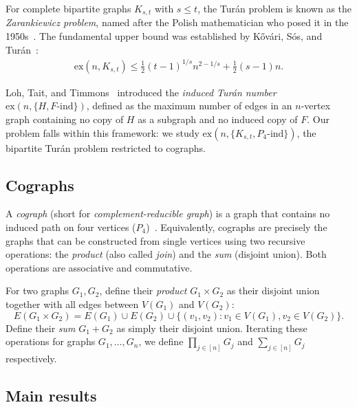 \documentclass{article}
\theoremstyle{definition}
\theoremstyle{definition}
\theoremstyle{definition}
\theoremstyle{definition}
\theoremstyle{definition}
\theoremstyle{definition}
\theoremstyle{definition}
\theoremstyle{definition}
\theoremstyle{definition}
\theoremstyle{definition}
\begin{document}
For complete bipartite graphs $K_{s,t}$ with $s \leq t$, the Turán problem is known as the \emph{Zarankiewicz problem}, named after the Polish mathematician who posed it in the 1950s~\cite{Smorodinsky2023}.
The fundamental upper bound was established by K\H{o}v\'ari, S\'os, and Tur\'an~\cite{KovariSosTuran1954}:
\begin{align}
    \text{ex}(n, K_{s,t}) \leq \tfrac{1}{2}(t-1)^{1/s} n^{2-1/s} + \tfrac{1}{2}(s-1)n. \label{eq:KST_background}
\end{align}

Loh, Tait, and Timmons~\cite{Loh2016} introduced the \emph{induced Tur\'an number} $\text{ex}(n, \{H, F\text{-ind}\})$, defined as the maximum number of edges in an $n$-vertex graph containing no copy of $H$ as a subgraph and no induced copy of $F$.
Our problem falls within this framework: we study $\text{ex}(n, \{K_{s,t}, P_4\text{-ind}\})$, the bipartite Tur\'an problem restricted to cographs.

\subsection{Cographs}

A \emph{cograph} (short for \emph{complement-reducible graph}) is a graph that contains no induced path on four vertices ($P_4$)~\cite{Corneil1981}.
Equivalently, cographs are precisely the graphs that can be constructed from single vertices using two recursive operations: the \emph{product} (also called \emph{join}) and the \emph{sum} (disjoint union).
Both operations are associative and commutative.

For two graphs $G_1, G_2$, define their \emph{product} $G_1 \times G_2$ as their disjoint union together with all edges between $V(G_1)$ and $V(G_2)$:
\[
E(G_1 \times G_2) = E(G_1) \cup E(G_2) \cup \{(v_1, v_2) : v_1 \in V(G_1), v_2 \in V(G_2)\}.
\]
Define their \emph{sum} $G_1 + G_2$ as simply their disjoint union.
Iterating these operations for graphs $G_1, \ldots, G_n$, we define $\prod_{j \in [n]} G_j$ and $\sum_{j \in [n]} G_j$ respectively.

\subsection{Main results} \label{sec:main_results_intro}
\end{document}
